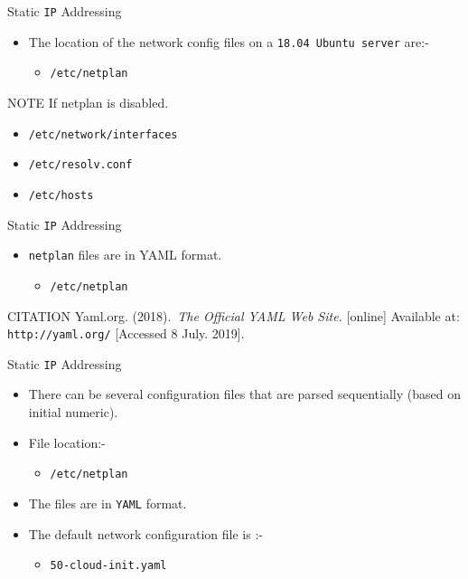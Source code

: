\documentclass{beamer}
\begin{document}
\begin{frame}{Static \texttt{IP} Addressing}
  \begin{itemize}
    \item The location of the network config files on a \texttt{18.04 Ubuntu server} are:-
    \begin{itemize}
      \item \texttt{/etc/netplan}
    \end{itemize} 
  \end{itemize}
  \begin{block}{NOTE}
    If netplan is disabled.
    \begin{itemize}
      \item \texttt{/etc/network/interfaces}
      \item \texttt{/etc/resolv.conf}
      \item \texttt{/etc/hosts}
    \end{itemize} 
  \end{block}
\end{frame}

\begin{frame}{Static \texttt{IP} Addressing}
  \begin{itemize}
    \item \texttt{netplan} files are in YAML format.
    \begin{itemize}
      \item \texttt{/etc/netplan}
    \end{itemize} 
  \end{itemize}
  \begin{block}{CITATION}
    Yaml.org. (2018). \textit{The Official YAML Web Site.} [online] Available at: \texttt{http://yaml.org/} [Accessed 8 July. 2019].
  \end{block}
\end{frame}

\begin{frame}{Static \texttt{IP} Addressing}
  \begin{itemize}
    \item There can be several configuration files that are parsed sequentially (based on initial numeric).
    \item File location:-
    \begin{itemize}
      \item \texttt{/etc/netplan}
    \end{itemize} 
    \item The files are in \texttt{YAML} format.
    \item The default network configuration file is :-
    \begin{itemize}
      \item \texttt{50-cloud-init.yaml}
    \end{itemize} 
  \end{itemize}
\end{frame}
\end{document}
